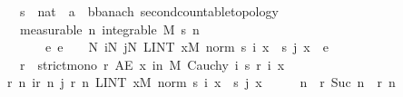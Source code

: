 \begin{isabellebody}
\ \ \ s\ {\isacharcolon}{\kern0pt}{\isacharcolon}{\kern0pt}\ {\isachardoublequoteopen}nat\ {\isasymRightarrow}\ {\isacharprime}{\kern0pt}a\ {\isasymRightarrow}\ {\isacharprime}{\kern0pt}b{\isacharcolon}{\kern0pt}{\isacharcolon}{\kern0pt}{\isacharbraceleft}{\kern0pt}banach{\isacharcomma}{\kern0pt}\ second{\isacharunderscore}{\kern0pt}countable{\isacharunderscore}{\kern0pt}topology{\isacharbraceright}{\kern0pt}{\isachardoublequoteclose}\isanewline
\ \ \ {\isacharbrackleft}{\kern0pt}measurable{\isacharbrackright}{\kern0pt}{\isacharcolon}{\kern0pt}\ {\isachardoublequoteopen}{\isasymAnd}n{\isachardot}{\kern0pt}\ integrable\ M\ {\isacharparenleft}{\kern0pt}s\ n{\isacharparenright}{\kern0pt}{\isachardoublequoteclose}\isanewline
\ \ \ \ \ \ \ {\isachardoublequoteopen}{\isasymAnd}e{\isachardot}{\kern0pt}\ e\ {\isachargreater}{\kern0pt}\ {}\ {\isasymLongrightarrow}\ {\isasymexists}N{\isachardot}{\kern0pt}\ {\isasymforall}i{\isasymge}N{\isachardot}{\kern0pt}\ {\isasymforall}j{\isasymge}N{\isachardot}{\kern0pt}\ LINT\ x{\isacharbar}{\kern0pt}M{\isachardot}{\kern0pt}\ norm\ {\isacharparenleft}{\kern0pt}s\ i\ x\ {\isacharminus}{\kern0pt}\ s\ j\ x{\isacharparenright}{\kern0pt}\ {\isacharless}{\kern0pt}\ e{\isachardoublequoteclose}\isanewline
\ \ \ r\ \ {\isachardoublequoteopen}strict{\isacharunderscore}{\kern0pt}mono\ r{\isachardoublequoteclose}\ {\isachardoublequoteopen}AE\ x\ in\ M{\isachardot}{\kern0pt}\ Cauchy\ {\isacharparenleft}{\kern0pt}{\isasymlambda}i{\isachardot}{\kern0pt}\ s\ {\isacharparenleft}{\kern0pt}r\ i{\isacharparenright}{\kern0pt}\ x{\isacharparenright}{\kern0pt}{\isachardoublequoteclose}\isanewline
%
\isadelimproof
%
\endisadelimproof
%
\isatagproof
{}\isamarkupfalse%
{\isacharminus}{\kern0pt}\isanewline
\ \ \isamarkupfalse%
\ {\isachardoublequoteopen}{\isasymexists}r{\isachardot}{\kern0pt}\ {\isasymforall}n{\isachardot}{\kern0pt}\ {\isacharparenleft}{\kern0pt}{\isasymforall}i{\isasymge}r\ n{\isachardot}{\kern0pt}\ {\isasymforall}j{\isasymge}\ r\ n{\isachardot}{\kern0pt}\ LINT\ x{\isacharbar}{\kern0pt}M{\isachardot}{\kern0pt}\ norm\ {\isacharparenleft}{\kern0pt}s\ i\ x\ {\isacharminus}{\kern0pt}\ s\ j\ x{\isacharparenright}{\kern0pt}\ {\isacharless}{\kern0pt}\ {\isacharparenleft}{\kern0pt}{}\ {\isacharslash}{\kern0pt}\ {}{\isacharparenright}{\kern0pt}\ {\isacharcircum}{\kern0pt}\ n{\isacharparenright}{\kern0pt}\ {\isasymand}\ {\isacharparenleft}{\kern0pt}r\ {\isacharparenleft}{\kern0pt}Suc\ n{\isacharparenright}{\kern0pt}\ {\isachargreater}{\kern0pt}\ r\ n{\isacharparenright}{\kern0pt}{\isachardoublequoteclose}\isanewline

\end{isabellebody}
